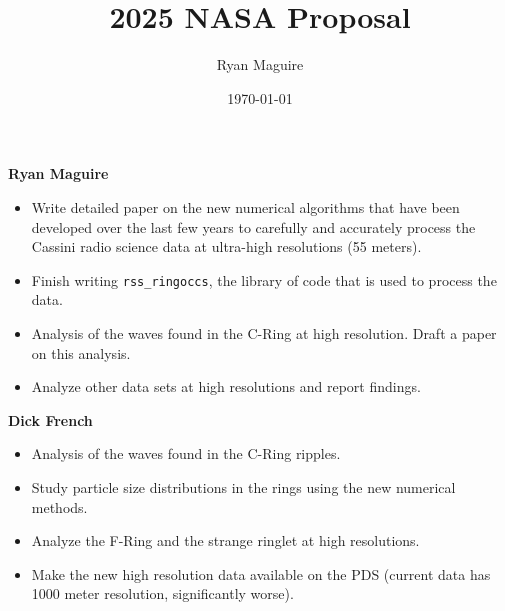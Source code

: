 \documentclass{article}
\title{2025 NASA Proposal}
\author{Ryan Maguire}
\date{\today}
\begin{document}
    \maketitle

    \textbf{Ryan Maguire}
    \begin{itemize}
        \item
            Write detailed paper on the new numerical algorithms that have been
            developed over the last few years to carefully and accurately
            process the Cassini radio science data at ultra-high resolutions
            (55 meters).
        \item
            Finish writing \texttt{rss\_ringoccs}, the library of code
            that is used to process the data.
        \item
            Analysis of the waves found in the C-Ring at high resolution.
            Draft a paper on this analysis.
        \item
            Analyze other data sets at high resolutions and report findings.
    \end{itemize}

    \textbf{Dick French}
    \begin{itemize}
        \item
            Analysis of the waves found in the C-Ring ripples.
        \item
            Study particle size distributions in the rings using the new
            numerical methods.
        \item
            Analyze the F-Ring and the strange ringlet at high resolutions.
        \item
            Make the new high resolution data available on the PDS
            (current data has 1000 meter resolution, significantly worse).
    \end{itemize}
\end{document}
